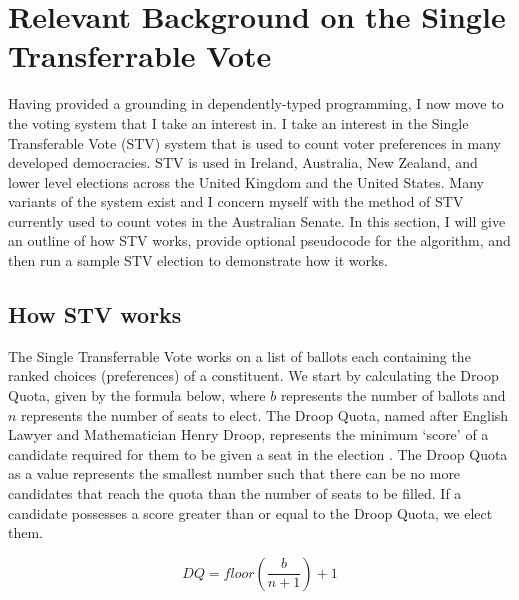 \chapter{Relevant Background on the Single Transferrable Vote}

Having provided a grounding in dependently-typed programming, I now move to the
voting system that I take an interest in. I take an interest in the Single
Transferable Vote (STV) system that is used to count voter preferences in many
developed democracies. STV is used in Ireland, Australia, New Zealand, and lower
level elections across the United Kingdom and the United States. Many variants
of the system exist and I concern myself with the method of STV currently used
to count votes in the Australian Senate. In this section, I will give an outline
of how STV works, provide optional pseudocode for the algorithm, and then run a
sample STV election to demonstrate how it works. 

\section{How STV works}

The Single Transferrable Vote works on a list of ballots each containing the
ranked choices (preferences) of a constituent. We start by calculating the Droop
Quota, given by the formula below, where $b$ represents the number of ballots
and $n$ represents the number of seats to elect. The Droop Quota, named after
English Lawyer and Mathematician Henry Droop, represents the minimum `score' of
a candidate required for them to be given a seat in the election
\cite{henry_droop}. The Droop Quota as a value represents the smallest number
such that there can be no more candidates that reach the quota than the number
of seats to be filled. If a candidate possesses a score greater than or equal to
the Droop Quota, we elect them. 

$$
DQ = floor(\frac{b}{n + 1}) + 1
$$


